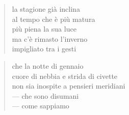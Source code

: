 \clearpage


	\begin{verse}
		la stagione già inclina\\
		al tempo che è più matura\\
		più piena la sua luce\\
		ma c’è rimasto l’inverno\\
		impigliato tra i gesti
	\end{verse}

\clearpage


	\begin{verse}
		che la notte di gennaio\\
		cuore di nebbia e strida di civette\\
		non sia inospite a pensieri meridiani\\
		— che sono disumani\\
		— come sappiamo
	\end{verse}
